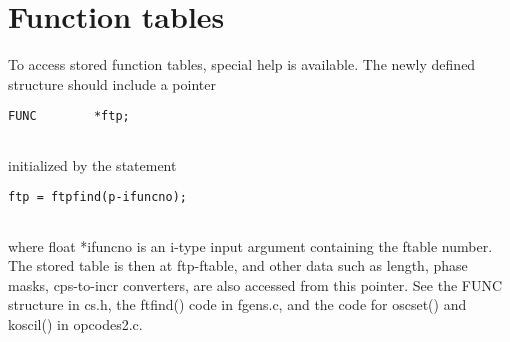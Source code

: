  
\section{Function tables}


  To access stored function tables, special help is available. The newly defined structure should include a pointer 


 
\begin{lstlisting}
FUNC        *ftp;
        
\end{lstlisting}


 


  initialized by the statement 


 
\begin{lstlisting}
ftp = ftpfind(p-ifuncno);
        
\end{lstlisting}


 


  where float *ifuncno is an i-type input argument containing the ftable number. The stored table is then at ftp-ftable, and other data such as length, phase masks, cps-to-incr converters, are also accessed from this pointer. See the FUNC structure in cs.h, the ftfind() code in fgens.c, and the code for oscset() and koscil() in opcodes2.c. 


\begin{comment}
\begin{tabular}{lcr}
Previous &Home &Next \\
Compiling a Cscore Program &Up &Additional Space

\end{tabular}



\end{comment}
